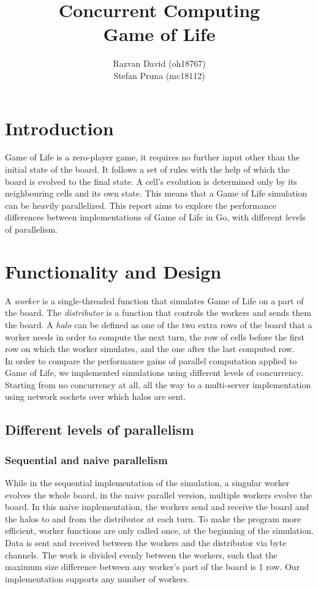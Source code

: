 \documentclass[a4, 11pt]{article}
\title{Concurrent Computing\\Game of Life}
\author{Razvan David (oh18767)\\Stefan Pruna (mc18112)}
\begin{document}
\maketitle

\section{Introduction}
\label{sec:intro}
\begin{multicols}{2}

Game of Life is a zero-player game, it requires no further input other than the initial state of the board. It follows a set of rules with the help of which the board is evolved to the final state. A cell's evolution is determined only by its neighbouring cells and its own state. This means that a Game of Life simulation can be heavily parallelized. This report aims to explore the performance differences between implementations of Game of Life in Go, with different levels of parallelism.
 
\section{Functionality and Design }

A \textit{worker} is a single-threaded function that simulates Game of Life on a part of the board. The \textit{distributor} is a function that controls the workers and sends them the board. A \textit{halo} can be defined as one of the two extra rows of the board that a worker needs in order to compute the next turn, the row of cells before the first row on which the worker simulates, and the one after the last computed row. \\
In order to compare the performance gains of parallel computation applied to Game of Life, we implemented simulations using different levels of concurrency. Starting from no concurrency at all, all the way to a multi-server implementation using network sockets over which halos are sent. 

\subsection{Different levels of parallelism}

\subsubsection{Sequential and naive parallelism}
While in the sequential implementation of the simulation, a singular worker evolves the whole board, in the naive parallel version, multiple workers evolve the board. In this naive implementation, the workers send and receive the board and the halos to and from the distributor at each turn. To make the program more efficient, worker functions are only called once, at the beginning of the simulation. Data is sent and received between the workers and the distributor via byte channels. The work is divided evenly between the workers, such that the maximum size difference between any worker's part of the board is 1 row. Our implementation supports any number of workers.


\end{multicols}
\end{document}
